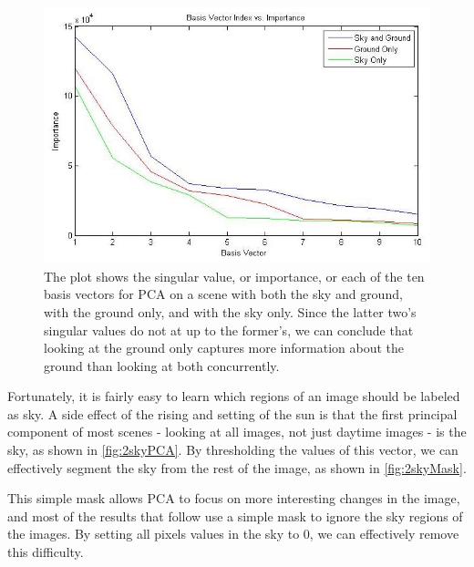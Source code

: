 \begin{figure}[t]
	\centering
		\includegraphics[width=.7\textwidth]{figures/skyMaskFig.jpg}
	
		\caption[Singular values of scenes with and without the sky.]{The plot shows the singular value, or importance, or each of the ten basis vectors for PCA on a scene with both the sky and ground, with the ground only, and with the sky only.  Since the latter two's singular values do not at up to the former's, we can conclude that looking at the ground only captures more information about the ground than looking at both concurrently.}
		
	\label{fig:skyMaskFig}
\end{figure}

Fortunately, it is fairly easy to learn which regions of an image should be labeled as sky.  A side effect of the rising and setting of the sun is that the first principal component of most scenes - looking at all images, not just daytime images - is the sky, as shown in \ref{fig:2skyPCA}.  By thresholding the values of this vector, we can effectively segment the sky from the rest of the image, as shown in \ref{fig:2skyMask}.

This simple mask allows PCA to focus on more interesting changes in the image, and most of the results that follow use a simple mask to ignore the sky regions of the images.  By setting all pixels values in the sky to 0, we can effectively remove this difficulty.


